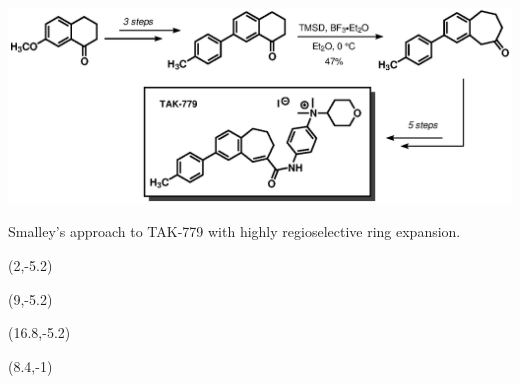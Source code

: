 \begin{Scheme}[t]
  \centering \includegraphics[scale=0.8]{chp_singlecarbon/images/smalley}
  \caption{Smalley's approach to TAK-779 with highly regioselective ring
  expansion.}
  \begin{textblock}{1}(2,-5.2)  \end{textblock}
  \begin{textblock}{1}(9,-5.2)  \end{textblock}
  \begin{textblock}{1}(16.8,-5.2)  \end{textblock}
  \begin{textblock}{1}(8.4,-1)  \end{textblock}
  \label{sch:smalley}
\end{Scheme}

